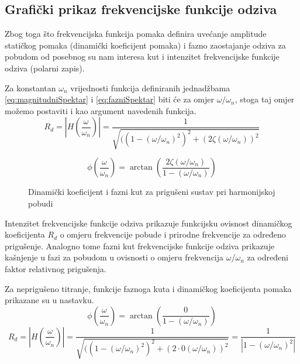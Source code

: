 \subsection{Grafički prikaz frekvencijske funkcije odziva}
Zbog toga što frekvencijska funkcija pomaka definira uvećanje amplitude statičkog
pomaka (dinamički koeficijent pomaka) i fazno zaostajanje odziva za pobudom od posebnog 
su nam interesa kut i intenzitet frekvencijske funkcije odziva (polarni zapis).
\par

Za konstantan $\omega_n$ vrijednosti funkcija definiranih jednadžbama 
\eqref{eq:magnitudniSpektar} i \eqref{eq:fazniSpektar} biti će za omjer
$\omega/\omega_n$, stoga taj omjer možemo postaviti i kao argument navedenih
funkcija. 
\begin{equation}\label{eq:magnitudniSpektarZaOmjer}
    R_d = \left|H\left(\frac{\omega}{\omega_n}\right)\right|=
        \frac{1}{\sqrt{((1-(\omega/\omega_n)^2)^2+(2\zeta(\omega/\omega_n))^2}}
\end{equation}

\begin{equation}\label{eq:fazniSpektarZaOmjer}
    \phi\left(\frac{\omega}{\omega_n}\right)=
        \arctan\left(\frac{2\zeta(\omega/\omega_n)}{1-(\omega/\omega_n)}\right)
\end{equation}

\begin{figure}[H]
    \begin{subfigure}{1\textwidth}
        
    \end{subfigure}
    \vfill
    \begin{subfigure}{1\textwidth}
        
    \end{subfigure}
    \caption{Dinamički koeficijent i fazni kut za prigušeni sustav pri harmonijskoj
    pobudi}
    \label{fig:frf-priguseno}
\end{figure}

Intenzitet frekvencijske funkcije odziva prikazuje funkcijsku ovisnost
dinamičkog koeficijenta $R_d$ o omjeru frekvencije pobude i prirodne frekvencije za
određeno prigušenje. Analogno tome fazni kut frekvencijske funkcije odziva
prikazuje kašnjenje u fazi za pobudom u ovisnosti o omjeru frekvencija 
$\omega/\omega_n$ za određeni faktor relativnog prigušenja.
\par

Za neprigušeno titranje, funkcije faznoga kuta i dinamičkog koeficijenta pomaka prikazane 
su u nastavku.
\begin{equation}\label{eq:fazniSpektarNepriguseno}
    \phi\left(\frac{\omega}{\omega_n}\right)=
        \arctan\left(\frac{0}{1-(\omega/\omega_n)}\right)
\end{equation}
\begin{equation}\label{eq:magnitudniSpektarNepriguseno}
    R_d=\left|H\left(\frac{\omega}{\omega_n}\right)\right|=
        \frac{1}{\sqrt{((1-(\omega/\omega_n)^2)^2+(2\cdot 0(\omega/\omega_n))^2}} =
        \frac{1}{|1-(\omega/\omega_n)^2|}
\end{equation}

